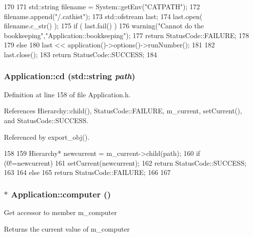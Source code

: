 \begin{DoxyCode}
170                                       {
171   std::string filename = System::getEnv("CATPATH");
172   filename.append("/.cathist");
173   std::ofstream last;
174   last.open( filename.c_str() );
175   if ( last.fail() ) {
176     warning("Cannot do the bookkeeping","Application::bookkeeping");
177     return StatusCode::FAILURE;
178   }
179   else {
180     last << application()->options()->runNumber();
181   }
182   last.close();
183   return StatusCode::SUCCESS;
184 }
\end{DoxyCode}
\hypertarget{classApplication_a29aa0687ea27762ce36ab4195bf5d77f}{
\subsubsection[{cd}]{ Application::cd (std::string {\em path})}}
\label{classApplication_a29aa0687ea27762ce36ab4195bf5d77f}


Definition at line 158 of file Application.h.

References Hierarchy::child(), StatusCode::FAILURE, m\_\-current, setCurrent(), and StatusCode::SUCCESS.

Referenced by export\_\-obj().


\begin{DoxyCode}
158                                  {
159     Hierarchy* newcurrent = m_current->child(path);
160     if (0!=newcurrent) {
161       setCurrent(newcurrent);
162       return StatusCode::SUCCESS;
163     }
164     else {
165       return StatusCode::FAILURE;
166     }
167   }
\end{DoxyCode}
\hypertarget{classApplication_ac5eb8a8e693d1b93426d7aabc6606d8b}{
\subsubsection[{computer}]{$\ast$ Application::computer ()}}
\label{classApplication_ac5eb8a8e693d1b93426d7aabc6606d8b}
Get accessor to member m\_\-computer \begin{DoxyReturn}{Returns}
the current value of m\_\-computer 
\end{DoxyReturn}


